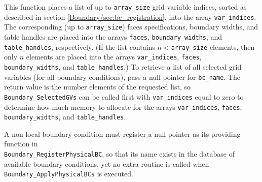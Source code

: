 \documentclass{article}
\begin{document}
This function places a list of up to \texttt{array\_size} grid
variable indices, sorted as described in section
\ref{Boundary/sec:bc_registration}, into the array \texttt{var\_indices}.  The
corresponding (up to \texttt{array\_size}) faces specifications,
boundary widths, and table handles are placed into the arrays
\texttt{faces}, \texttt{boundary\_widths}, and
\texttt{table\_handles}, respectively.  (If the list contains
$n<$\texttt{array\_size} elements, then only $n$ elements are placed
into the arrays \texttt{var\_indices}, \texttt{faces},
\texttt{boundary\_widths}, and \texttt{table\_handles}.)  To retrieve
a list of all selected grid variables (for all boundary conditions),
pass a null pointer for \texttt{bc\_name}.  The return value is the
number elements of the requested list, so
\texttt{Boundary\_SelectedGVs} can be called first with
\texttt{var\_indices} equal to zero to determine how much memory to
allocate for the arrays \texttt{var\_indices}, \texttt{faces},
\texttt{boundary\_widths}, and \texttt{table\_handles}.

A non-local boundary condition must register a null pointer as its
providing function in\\ \texttt{Boundary\_RegisterPhysicalBC}, so that
its name exists in the database of available boundary conditions, yet
no extra routine is called when \texttt{Boundary\_ApplyPhysicalBCs} is
executed.

\end{document}
